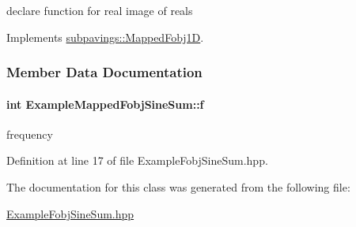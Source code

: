 declare function for real image of reals 



\-Implements \hyperlink{classsubpavings_1_1MappedFobj1D_abee3fbd4c06d7d2f6e276f31d485eb7c}{subpavings\-::\-Mapped\-Fobj1\-D}.



\subsubsection{\-Member \-Data \-Documentation}
\hypertarget{classExampleMappedFobjSineSum_aab80e21eb7ef35a502e58e8a3df3c678}{
\paragraph[{f}]{\setlength{\rightskip}{0pt plus 5cm}int {\bf \-Example\-Mapped\-Fobj\-Sine\-Sum\-::f}}}\label{classExampleMappedFobjSineSum_aab80e21eb7ef35a502e58e8a3df3c678}


frequency 



\-Definition at line 17 of file \-Example\-Fobj\-Sine\-Sum.\-hpp.



\-The documentation for this class was generated from the following file\-:\begin{DoxyCompactItemize}
\item 
\hyperlink{ExampleFobjSineSum_8hpp}{\-Example\-Fobj\-Sine\-Sum.\-hpp}\end{DoxyCompactItemize}
